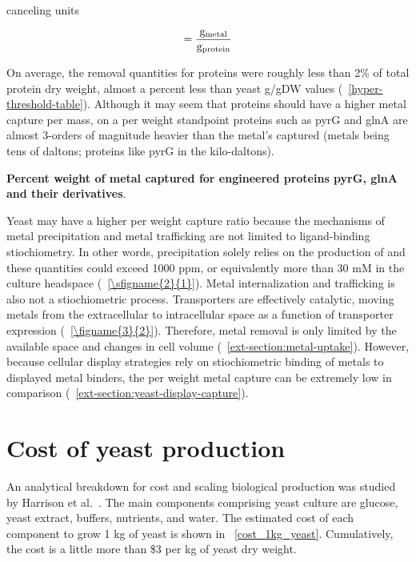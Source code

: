\documentclass[../main/main]{subfiles}
\begin{document}
canceling units

\begin{align}
  = \dfrac{\text{g\textsubscript{metal}}}
      {\text{g\textsubscript{protein}}}
\end{align}

On average, the removal quantities for proteins were roughly less than 2\% of total protein dry weight, almost a percent less than yeast g/gDW values (\TABLE~\ref{hyper-threshold-table}). Although it may seem that proteins should have a higher metal capture per mass, on a per weight standpoint proteins such as pyrG and glnA are almost 3-orders of magnitude heavier than the metal's captured (metals being tens of daltons; proteins like pyrG in the kilo-daltons).

\begin{table}[H]
  \centering
  \small
  
  \caption[Percent weight of metal captured for engineered proteins pyrG, glnA and their derivatives]
  {
    \textbf{Percent weight of metal captured for engineered proteins pyrG, glnA and their derivatives}.
  }
  \label{protein-hyper-threshold}
\end{table}

Yeast may have a higher per weight capture ratio because the mechanisms of \HS{} metal precipitation and metal trafficking are not limited to ligand-binding stiochiometry. In other words, \HS{} precipitation solely relies on the production of \HS{} and these quantities could exceed 1000 ppm, or equivalently more than 30 mM in the culture headspace (\FIGURE~\ref{\sfigname{2}{1}}). Metal internalization and trafficking is also not a stiochiometric process. Transporters are effectively catalytic, moving metals from the extracellular to intracellular space as a function of transporter expression (\FIGURE~\ref{\figname{3}{2}}).
Therefore, metal removal is only limited by the available space and changes in cell volume (\APPENDIX~\ref{ext-section:metal-uptake}). However, because cellular display strategies rely on stiochiometric binding of metals to displayed metal binders, the per weight metal capture can be extremely low in comparison (\APPENDIX~\ref{ext-section:yeast-display-capture}).
\clearpage %

\section{Cost of yeast production}
\label{section:appendixB:cost-of-yeast}
An analytical breakdown for cost and scaling biological production was studied by Harrison et al.~\cite{harrison2015}. The main components comprising yeast culture are glucose, yeast extract, buffers, nutrients, and water. The estimated cost of each component to grow 1 kg of yeast is shown in \TABLE~\ref{cost_1kg_yeast}. Cumulatively, the cost is a little more than \$3 per kg of yeast dry weight.
\end{document}
